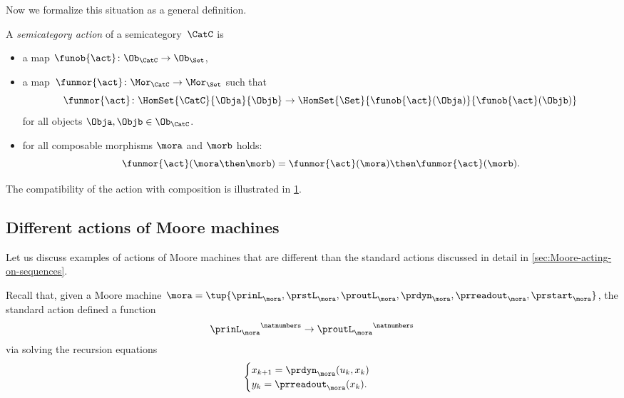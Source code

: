 Now we formalize this situation as a general definition. 

\begin{ctdefinition}
    \label{def:semicategory-action}
    A \emph{semicategory action} of a semicategory~$\CatC$ is
    
    \constit
    \begin{itemize}
        \item a map $\funob{\act} \colon \Ob_{\CatC} \to \Ob_{\Set}$,
        \item a map~$\funmor{\act} \colon \Mor_\CatC \to \Mor_\Set$ such that 
        \begin{equation}
\funmor{\act} \colon  \HomSet{\CatC}{\Obja}{\Objb} \to \HomSet{\Set}{ \funob{\act}(\Obja)}{\funob{\act}(\Objb)}
        \end{equation}
        for all objects $\Obja, \Objb \in \Ob_{\CatC}$. 
    \end{itemize}

    
    \condit
    
    \begin{itemize}
   \item for all composable morphisms $\mora$ and $\morb$ holds: 
   \begin{equation}
\funmor{\act}(\mora \then \morb) = \funmor{\act}(\mora) \then \funmor{\act}(\morb). 
    \end{equation}
    \end{itemize}
\end{ctdefinition}

The compatibility of the action with composition is illustrated in \cref{fig:semicat_ac_comm}. 

\begin{figure}[h!]
\label{fig:semicat_ac_comm}
    \begin{center}
    \end{center}
    \caption{}
\end{figure}


\subsection{Different actions of Moore machines}

Let us discuss examples of actions of Moore machines that are different than the standard actions discussed in detail in \cref{sec:Moore-acting-on-sequences}. 

Recall that, given a Moore machine $\mora = \tup{\prinL_\mora,\prstL_\mora,\proutL_\mora,\prdyn_\mora,\prreadout_\mora,\prstart_\mora}$, the standard action defined a function 
\begin{equation}
{\prinL_\mora}^\natnumbers \to {\proutL_\mora}^\natnumbers
\end{equation}
via solving the recursion equations 
\begin{equation}
\label{eq:moore-recursion-once-again}
    \begin{cases}
        x_{k+1} = \prdyn_\mora(u_k, x_k) \\
        y_{k}   = \prreadout_\mora(x_{k}).
    \end{cases}
\end{equation}

